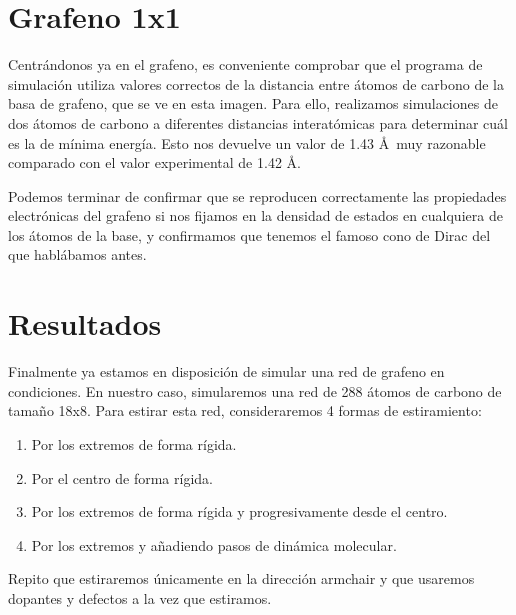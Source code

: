 \pasa

\section{Grafeno 1x1}

Centrándonos ya en el grafeno, es conveniente comprobar que el programa de simulación utiliza valores correctos de la distancia entre átomos de carbono de la basa de grafeno, que se ve en esta imagen. Para ello, realizamos simulaciones de dos átomos de carbono a diferentes distancias interatómicas para determinar cuál es la de mínima energía. Esto nos devuelve un valor de 1.43 \AA \ muy razonable comparado con el valor experimental de 1.42 \AA . \\

\pasa 

Podemos terminar de confirmar que se reproducen correctamente las propiedades electrónicas del grafeno si nos fijamos en la densidad de estados en cualquiera de los átomos de la base, y confirmamos que tenemos el famoso cono de Dirac del que hablábamos antes. 

\section{Resultados}

Finalmente ya estamos en disposición de simular una red de grafeno en condiciones. En nuestro caso, simularemos una red de 288 átomos de carbono de tamaño 18x8. Para estirar esta red, consideraremos 4 formas de estiramiento: 
\begin{enumerate}
    \item Por los extremos de forma rígida. 
    \item Por el centro de forma rígida.
    \item Por los extremos de forma rígida y progresivamente desde el centro. 
    \item Por los extremos y añadiendo pasos de dinámica molecular.
\end{enumerate}
Repito que estiraremos únicamente en la dirección armchair y que usaremos dopantes y defectos a la vez que estiramos. \\

\pasa




